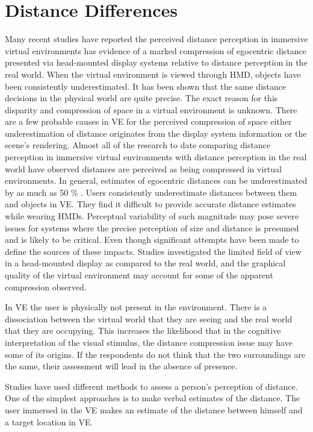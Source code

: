 \section{Distance Differences}
Many recent studies have reported the perceived distance perception in immersive virtual environments has evidence of a marked compression of egocentric distance presented via head-mounted display systems relative to distance perception in the real world\cite{phillips2009distance}.
When the virtual environment is viewed through HMD, objects have been consistently underestimated. It has been shown that the same distance decisions in the physical world are quite precise. The exact reason for this disparity and compression of space in a virtual environment is unknown. There are a few probable causes in VE for the perceived compression of space either underestimation of distance originates from the display system information or the scene’s rendering.
Almost all of the research to date comparing distance perception in immersive virtual environments with distance perception in the real world have observed distances are perceived as being compressed in virtual environments\cite{phillips2009distance}\cite{napieralski2011near}. In general, estimates of egocentric distances can be underestimated by as much as 50 \% \cite{loomis2003visual}. Users consistently underestimate distances between them and objects in VE. They find it difficult to provide accurate distance estimates while wearing HMDs\cite{loomis2003visual}. 
Perceptual variability of such magnitude may pose severe issues for systems where the precise perception of size and distance is presumed and is likely to be critical. Even though significant attempts have been made to define the sources of these impacts. Studies investigated the limited field of view in a head-mounted display as compared to the real world, and the graphical quality of the virtual environment may account for some of the apparent compression observed\cite{thompson2004does}. \par
In VE the user is physically not present in the environment. There is a dissociation between the virtual world that they are seeing and the real world that they are occupying. This increases the likelihood that in the cognitive interpretation of the visual stimulus, the distance compression issue may have some of its origins. If the respondents do not think that the two surroundings are the same, their assessment will lead in the absence of presence.\cite{phillips2009distance}\par
Studies have used different methods to assess a person's perception of distance. One of the simplest approaches is to make verbal estimates of the distance. The user immersed in the VE makes an estimate of the distance between himself and a target location in VE\cite{loomis2003visual}.
